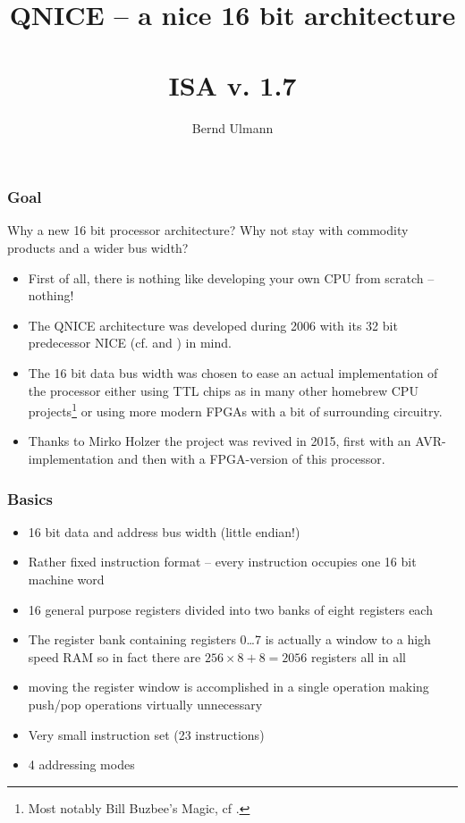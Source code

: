 \documentclass{beamer}
\title{QNICE -- a nice 16 bit architecture\\~\\ISA v. 1.7}
\author{Bernd Ulmann}
\begin{document}
 \begin{frame}
  \titlepage
 \end{frame}
%
   \begin{frame}
    \frametitle{Goal}
    Why a new 16 bit processor architecture? Why not stay with commodity
    products and a wider bus width?
    \begin{itemize}
     \item First of all, there is nothing like developing your own CPU
      from scratch -- nothing!
     \item The QNICE architecture was developed during 2006 with its
      32 bit predecessor NICE (cf. \cite{nice} and \cite{nice_html}) in
      mind. 
     \item The 16 bit data bus width was chosen to ease an actual 
      implementation of the processor either using TTL chips as in many
      other homebrew CPU projects\footnote{Most notably Bill Buzbee's
      Magic, cf \cite{magic}.} or using more modern FPGAs with a bit
      of surrounding circuitry.
     \item Thanks to Mirko Holzer the project was revived in 2015, 
      first with an AVR-implementation and then with a FPGA-version of
      this processor.
    \end{itemize}
   \end{frame}
%
   \begin{frame}
    \frametitle{Basics}
    \begin{itemize}
     \item 16 bit data and address bus width (little endian!)
     \item Rather fixed instruction format -- every instruction occupies
      one 16 bit machine word
     \item 16 general purpose registers divided into two banks of eight
      registers each
     \item The register bank containing registers 0\dots 7 is actually
      a window to a high speed RAM so in fact there are $256\times 8+8=2056$ 
      registers all in all
     \item moving the register window is accomplished in a single operation
      making push/pop operations virtually unnecessary
     \item Very small instruction set (23 instructions)
     \item 4 addressing modes
    \end{itemize}
   \end{frame}
\end{document}
